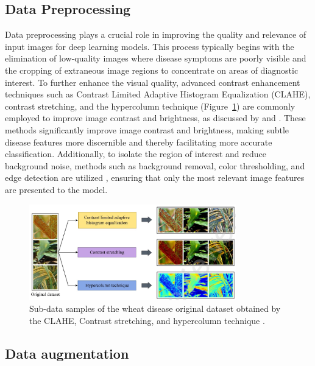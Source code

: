 \subsection{Data Preprocessing}
Data preprocessing plays a crucial role in improving the quality and relevance of input images for deep learning models. This process typically begins with the elimination of low-quality images where disease symptoms are poorly visible \parencite{yao2024yolo} and the cropping of extraneous image regions to concentrate on areas of diagnostic interest. To further enhance the visual quality, advanced contrast enhancement techniques such as Contrast Limited Adaptive Histogram Equalization (CLAHE), contrast stretching, and the hypercolumn technique (Figure~\ref{fig:CLAHE}) are commonly employed to improve image contrast and brightness, as discussed by \parencite{reis2024integrated} and \parencite{fang2023lightweight}. These methods significantly improve image contrast and brightness, making subtle disease features more discernible and thereby facilitating more accurate classification. Additionally, to isolate the region of interest and reduce background noise, methods such as background removal, color thresholding, and edge detection are utilized \parencite{alharbi2023wheat}, ensuring that only the most relevant image features are presented to the model.


\begin{figure}[H] %
    \centering
    \includegraphics[width=0.8\textwidth]{chapters/chapter3/images/Figure01.png}
    \caption{Sub-data samples of the wheat disease original dataset obtained by the CLAHE, Contrast stretching, and hypercolumn technique \parencite{reis2024integrated}.}
    \label{fig:CLAHE}
\end{figure}

\subsection{Data augmentation}

